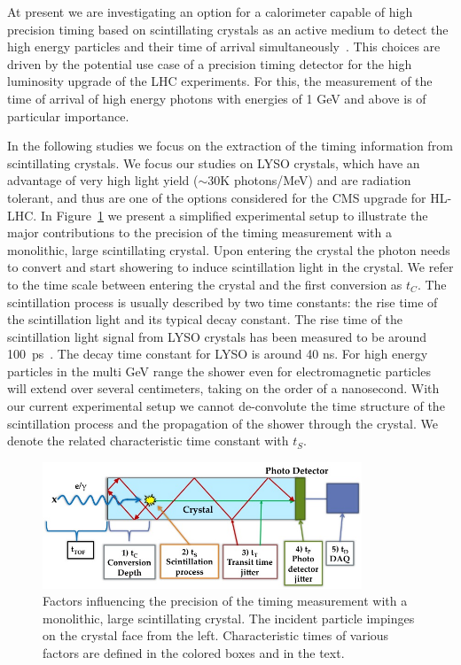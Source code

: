 \documentclass[12pt]{article}
\begin{document}
At present we are investigating an option for a calorimeter capable of high
precision timing based on  scintillating crystals
as an active medium to detect the high energy particles and their time of
arrival simultaneously~\cite{AdiCalor14}. This choices are driven by the
potential use case of a precision timing detector for the high luminosity
upgrade of the LHC experiments. For this, the measurement of the time of arrival
of high energy photons with energies of 1 GeV and above is of particular
importance. 

In the following studies we focus on the extraction of the timing information
from scintillating crystals. We focus our studies on LYSO crystals, which have
an advantage of very high light yield ($\sim 30$K photons/MeV) and are radiation
tolerant, and thus are one of the options considered for the CMS upgrade for
HL-LHC. In Figure~\ref{fig:ScintillatorTiming} we present a simplified
experimental setup to illustrate the major contributions to the precision of the
timing measurement with a monolithic, large scintillating crystal. Upon entering
the crystal the photon  needs to convert and start showering to induce
scintillation light in the crystal. We refer to the time scale between entering the crystal
and the first conversion as $t_C$. The
scintillation process is usually described by two time constants: the rise time
of the scintillation light and its typical decay constant. The rise time of the
scintillation light signal from LYSO crystals has been measured to be
around 100~ps~\cite{LYSOrisetime}. The decay time constant for LYSO is around 40 ns. For high energy particles in the multi GeV range the shower even for
electromagnetic particles will extend over several centimeters, taking on the
order of a nanosecond. With our current experimental setup we cannot
de-convolute the time structure of the scintillation process and the propagation
of the shower through the crystal. We denote the related characteristic time
constant with $t_S$. 

\begin{figure}[h] \centering
\includegraphics[width=0.85\textwidth]{figs/ScintillatorTiming} \caption{Factors
influencing the precision of the timing measurement with a monolithic, large
scintillating crystal. The incident particle impinges on the crystal face from
the left. Characteristic times of various factors are defined in the colored
boxes and in the text.}
\label{fig:ScintillatorTiming}
\end{figure}
\end{document}
